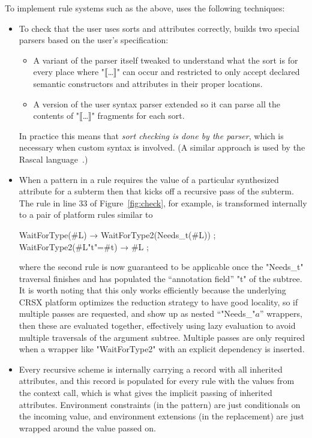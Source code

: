 \documentclass[letterpaper]{llncs}
\begin{document}
To implement rule systems such as the above, \HAX uses the following techniques:
\begin{itemize}

\item To check that the user uses sorts and attributes correctly, \HAX builds two special parsers
  based on the user's specification:
  \begin{itemize}

  \item A variant of the \HAX parser itself tweaked to understand what the sort is for every place
    where "⟦…⟧" can occur and restricted to only accept declared semantic constructors and
    attributes in their proper locations.

  \item A version of the user syntax parser extended so it can parse all the contents of "⟦…⟧"
    fragments for each sort.

  \end{itemize}
  In practice this means that \emph{sort checking is done by the parser}, which is necessary when
  custom syntax is involved. (A similar approach is used by the Rascal
  language~\cite{Bos+:eptcs2011}.)

\item When a pattern in a rule requires the value of a particular synthesized attribute for a
  subterm then that kicks off a recursive pass of the subterm. The rule in line 33 of
  Figure~\ref{fig:check}, for example, is transformed internally to a pair of platform rules similar
  to
  \begin{hacs}
      WaitForType(#L)  →    WaitForType2(Needs_t(#L)) ;
      WaitForType2(#L{"t"=#t}) →       #L ;
  \end{hacs}
  where the second rule is now guaranteed to be applicable once the "Needs_t" traversal finishes and
  has populated the ``annotation field'' "t" of the subtree.  It is worth noting that this only
  works efficiently because the underlying CRSX platform optimizes the reduction strategy to have
  good locality, so if multiple passes are requested, and show up as nested ``"Needs_"$a$''
  wrappers, then these are evaluated together, effectively using lazy evaluation to avoid multiple
  traversals of the argument subtree. Multiple passes are only required when a wrapper like
  "WaitForType2" with an explicit dependency is inserted.

\item Every recursive scheme is internally carrying a record with all inherited attributes, and this
  record is populated for every rule with the values from the context call, which is what gives the
  implicit passing of inherited attributes. Environment constraints (in the pattern) are just
  conditionals on the incoming value, and environment extensions (in the replacement) are just
  wrapped around the value passed on.

\end{itemize}
\end{document}
